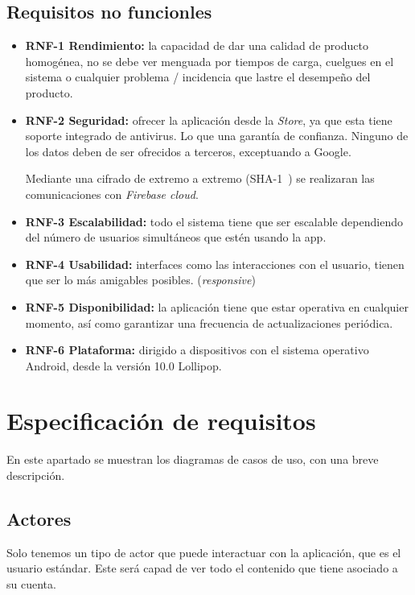 \subsection{Requisitos no funcionles}
\begin{itemize}
	\tightlist
	\item \textbf{RNF-1 Rendimiento:} la capacidad de dar una calidad de producto homogénea, no se debe ver menguada por tiempos de carga, cuelgues en el sistema o cualquier problema / incidencia que lastre el desempeño del producto.
	\item \textbf{RNF-2 Seguridad:} ofrecer la aplicación desde la \emph{Store}, ya que esta tiene soporte integrado de antivirus. Lo que una garantía de confianza. Ninguno de los datos deben de ser ofrecidos a terceros, exceptuando a Google. 
	
	Mediante una cifrado de extremo a extremo (SHA-1~\cite{wiki:sha1}) se realizaran las comunicaciones con \emph{Firebase cloud}.
	
	\item \textbf{RNF-3 Escalabilidad:} todo el sistema tiene que ser escalable dependiendo del número de usuarios simultáneos que estén usando la app.
	\item \textbf{RNF-4 Usabilidad:} interfaces como las interacciones con el usuario, tienen que ser lo más amigables posibles. (\emph{responsive})
	\item \textbf{RNF-5 Disponibilidad:} la aplicación tiene que estar operativa en cualquier momento, así como garantizar una frecuencia de actualizaciones periódica.
	\item \textbf{RNF-6 Plataforma:} dirigido a dispositivos con el sistema operativo Android, desde la versión 10.0 Lollipop.
\end{itemize}

\section{Especificación de requisitos}
En este apartado se muestran los diagramas de casos de uso, con una breve descripción.

\subsection{Actores}
Solo tenemos un tipo de actor que puede interactuar con la aplicación, que es el usuario estándar. Este será capad de ver todo el contenido que tiene asociado a su cuenta.

